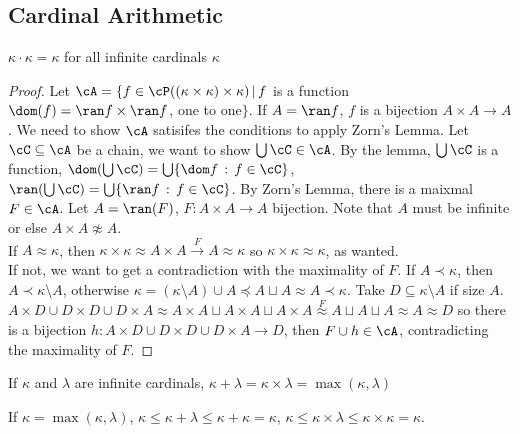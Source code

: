 
\subsection{Cardinal Arithmetic}

\begin{theorem}
    $\kappa \cdot \kappa = \kappa$ for all infinite cardinals $\kappa$
\end{theorem}

\begin{proof}
    Let $\cA = \{ f \in \cP((\kappa \times \kappa) \times \kappa) \, | \, f$ is a function $\dom(f) = \ran f \times \ran f$, one to one$\}$. If $A = \ran f$, $f$ is a bijection $A \times A \to A$. We need to show $\cA$ satisifes the conditions to apply Zorn's Lemma. Let $\cC \subseteq \cA$ be a chain, we want to show $\bigcup \cC \in \cA$. By the lemma, $\bigcup \cC$ is a function, $\dom (\bigcup \cC) = \bigcup \{ \dom f \, : \, f \in \cC\}$, $\ran(\bigcup \cC) = \bigcup \{ \ran f \, : \, f \in \cC\}$. By Zorn's Lemma, there is a maixmal $F \in \cA$. Let $A = \ran(F)$, $F: A \times A \to A$ bijection. Note that $A$ must be infinite or else $A \times A \not\approx A$. \\
    If $A \approx \kappa$, then $\kappa \times \kappa \approx A \times A \stackrel{F}{\to} A \approx \kappa$ so $\kappa \times \kappa \approx \kappa$, as wanted. \\
    If not, we want to get a contradiction with the maximality of $F$. If $A \prec \kappa$, then $A \prec \kappa \setminus A$, otherwise $\kappa = (\kappa \setminus A) \cup A \preceq A \sqcup A \approx A \prec \kappa$. Take $D \subseteq \kappa \setminus A$ if size $A$. $A \times D \cup D \times D \cup D \times A \approx A \times A \sqcup A \times A \sqcup A \times A \stackrel{F}{\approx} A \sqcup A \sqcup A \approx A \approx D$ so there is a bijection $h: A \times D \cup D \times D \cup D \times A \to D$, then $F \cup h \in \cA$, contradicting the maximality of $F$. 
\end{proof}

\begin{corollary}
    If $\kappa$ and $\lambda$ are infinite cardinals, $\kappa + \lambda = \kappa \times \lambda = \max(\kappa, \lambda)$  
\end{corollary}

\begin{pf}
    If $\kappa = \max(\kappa, \lambda)$, $\kappa \le \kappa + \lambda \le \kappa + \kappa = \kappa$, $\kappa \le \kappa \times \lambda \le \kappa \times \kappa = \kappa$. 
\end{pf}

